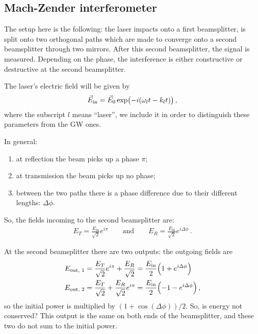 \documentclass[main.tex]{subfiles}
\begin{document}
\subsection{Mach-Zender interferometer}

The setup here is the following: the laser impacts onto a first beamsplitter, is split onto two orthogonal paths which are made to converge onto a second beamsplitter through two mirrors. After this second beamsplitter, the signal is measured. Depending on the phase, the interference is either constructive or destructive at the second beamsplitter. 

The laser's electric field will be given by
%
\begin{align}
\vec{E} _{\text{in}} = \vec{E}_{0} \exp(-i \qty(\omega_{l} t - k_l t))
\,,
\end{align}
%
where the subscript \(l\) means ``laser'', we include it in order to distinguish these parameters from the GW ones.

In general: 
\begin{enumerate}
    \item at reflection the beam picks up a phase \(\pi \);
    \item at transmission the beam picks up no phase;
    \item between the two paths there is a phase difference due to their different lengths: \(\Delta \phi \). 
\end{enumerate}

So, the fields incoming to the second beamsplitter are:
%
\begin{align}
E_T = \frac{E _{\text{in}}}{\sqrt{2}} e^{i \pi }
\qquad \text{and} \qquad
E_R = \frac{E _{\text{in}}}{\sqrt{2}} e^{i \Delta \phi } 
\,.
\end{align}

At the second beamsplitter there are two outputs: the outgoing fields are 
%
\begin{align}
E _{\text{out, }1} &= \frac{E_{T}}{\sqrt{2}} e^{i \pi }
+ \frac{E_{R}}{\sqrt{2}} = \frac{E_{\text{in}}}{2} \qty(1 + e^{i \Delta \phi })  \\
E _{\text{out, }2} &= \frac{E_{T}}{\sqrt{2}}
+ \frac{E_{R}}{\sqrt{2}} e^{i \pi } = \frac{E_{\text{in}}}{2} \qty(- 1 - e^{i \Delta \phi }) 
\,,
\end{align}
%
so the initial power is multiplied by \((1 + \cos( \Delta \phi )) / 2 \). 
So, is energy not conserved? This output is the same on both ends of the beamsplitter, and these two do not sum to the initial power.
\end{document}
